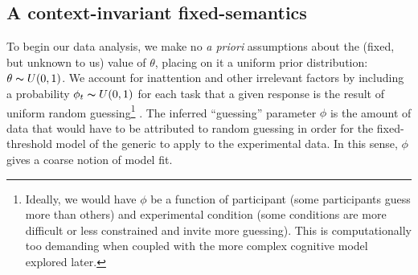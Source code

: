 \documentclass[10pt,letterpaper]{article}
\begin{document}
\subsection{A context-invariant fixed-semantics}
To begin our data analysis, we make no \emph{a priori} assumptions about the (fixed, but unknown to us) value of $\theta$, placing on it a uniform prior distribution: $\theta \thicksim U(0,1)$. 
We account for inattention and other irrelevant factors by including a probability $\phi_{t}\thicksim U(0,1)$ for each task that a given response is the result of uniform random guessing\footnote{Ideally, we would have $\phi$ be a function of participant (some participants guess more than others) and experimental condition (some conditions are more difficult or less constrained and invite more guessing). This is computationally too demanding when coupled with the more complex cognitive model explored later.}  \cite{LW2014}.
The inferred ``guessing'' parameter $\phi$ is the amount of data that would have to be attributed to random guessing in order for the fixed-threshold model of the generic to apply to the experimental data. In this sense, $\phi$ gives a coarse notion of model fit. 


%



%
\end{document}
